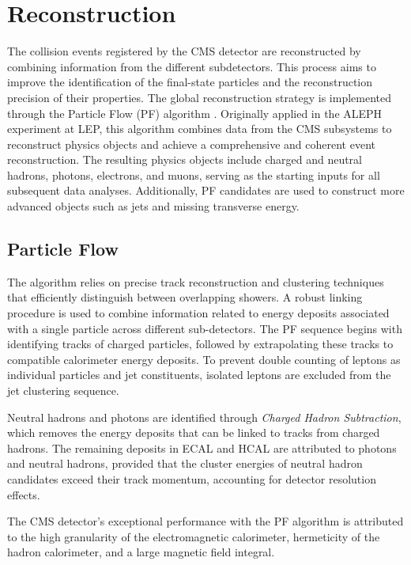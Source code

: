 \chapter{Reconstruction}

The collision events registered by the CMS detector are reconstructed by combining information from the different subdetectors.
This process aims to improve the identification of the final-state particles and the reconstruction precision of their properties.
The global reconstruction strategy is implemented through the Particle Flow (PF) algorithm \cite{ParticleFlow}.
Originally applied in the ALEPH experiment at LEP, this algorithm combines data from the CMS subsystems to reconstruct physics objects and achieve a comprehensive and coherent event reconstruction.
The resulting physics objects include charged and neutral hadrons, photons, electrons, and muons, serving as the starting inputs for all subsequent data analyses.
Additionally, PF candidates are used to construct more advanced objects such as jets and missing transverse energy.

\section{Particle Flow}
\label{sec:ParticleFlow}
The algorithm relies on precise track reconstruction and clustering techniques that efficiently distinguish between overlapping showers.
A robust linking procedure is used to combine information related to energy deposits associated with a single particle across different sub-detectors.
The PF sequence begins with identifying tracks of charged particles, followed by extrapolating these tracks to compatible calorimeter energy deposits.
To prevent double counting of leptons as individual particles and jet constituents, isolated leptons are excluded from the jet clustering sequence.

Neutral hadrons and photons are identified through \textit{Charged Hadron Subtraction}, which removes the energy deposits that can be linked to tracks from charged hadrons.
The remaining deposits in ECAL and HCAL are attributed to photons and neutral hadrons,
provided that the cluster energies of neutral hadron candidates exceed their track momentum, accounting for detector resolution effects.

The CMS detector's exceptional performance with the PF algorithm is attributed to the high granularity of the electromagnetic calorimeter, hermeticity of the hadron calorimeter, and a large magnetic field integral.

